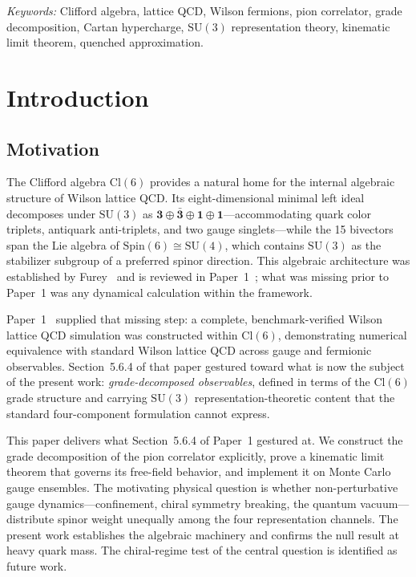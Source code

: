 \documentclass[12pt]{article}
\theoremstyle{definition}
\theoremstyle{remark}
\newcommand{\cl}{\mathrm{Cl}}           %
\newcommand{\spin}{\mathrm{Spin}}       %
\newcommand{\su}{\mathrm{SU}}           %
\begin{document}
	\bigskip
	\noindent\textit{Keywords:} Clifford algebra, lattice QCD, Wilson
	fermions, pion correlator, grade decomposition, Cartan hypercharge,
	$\su(3)$ representation theory, kinematic limit theorem, quenched
	approximation.
	
	\section{Introduction}
	\label{sec:intro}
	
	\subsection{Motivation}
	\label{sec:motivation}
	
	The Clifford algebra $\cl(6)$ provides a natural home for the internal
	algebraic structure of Wilson lattice QCD.  Its eight-dimensional minimal
	left ideal decomposes under $\su(3)$ as
	$\mathbf{3}\oplus\bar{\mathbf{3}}\oplus\mathbf{1}\oplus\mathbf{1}$---accommodating
	quark color triplets, antiquark anti-triplets, and two gauge singlets---while
	the 15 bivectors span the Lie algebra of $\spin(6)\cong\su(4)$, which
	contains $\su(3)$ as the stabilizer subgroup of a preferred spinor direction.
	This algebraic architecture was established by
	Furey~\cite{Furey2012,Furey2014,Furey2015,Furey2018a,Furey2018b} and is
	reviewed in Paper~1~\cite{FirestoneP1}; what was missing prior to Paper~1
	was any dynamical calculation within the framework.
	
	Paper~1~\cite{FirestoneP1} supplied that missing step: a complete,
	benchmark-verified Wilson lattice QCD simulation was constructed within
	$\cl(6)$, demonstrating numerical equivalence with standard Wilson lattice
	QCD across gauge and fermionic observables.  Section~5.6.4 of that paper
	gestured toward what is now the subject of the present work:
	\emph{grade-decomposed observables}, defined in terms of the $\cl(6)$ grade
	structure and carrying $\su(3)$ representation-theoretic content that the
	standard four-component formulation cannot express.
	
	This paper delivers what Section~5.6.4 of Paper~1 gestured at.  We construct
	the grade decomposition of the pion correlator explicitly, prove a kinematic
	limit theorem that governs its free-field behavior, and implement it on Monte
	Carlo gauge ensembles.  The motivating physical question is whether
	non-perturbative gauge dynamics---confinement, chiral symmetry breaking, the
	quantum vacuum---distribute spinor weight unequally among the four
	representation channels.  The present work establishes the algebraic machinery
	and confirms the null result at heavy quark mass.  The chiral-regime test of
	the central question is identified as future work.
	
\end{document}
